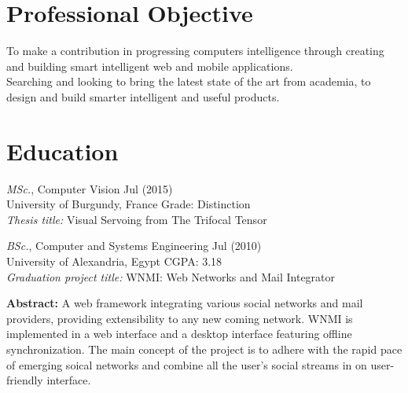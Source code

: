 \documentclass{res}
\newenvironment{details}{\vspace*{-4pt} \begin{list}{\topsep 0pt \itemsep -2pt}}{\vspace*{4pt}\end{list}}
\begin{document}
\pagestyle{empty}
\renewcommand{\headrulewidth}{0.0pt}
\pagestyle{fancy}
\lhead{}
\chead{}
\rhead{}
\lfoot{}
\cfoot{}
\address{ 7 Square du Bois Perrin, 35700, Rennes, France \\ +33603754150  \href{mailto:marwan.aosman@gmail.com}{marwan.aosman@gmail.com} \\ \url{http://www.marwanosman.com}}

\begin{resume}

\section{Professional Objective}
To make a contribution in progressing computers intelligence through creating and building smart intelligent web and mobile applications. \\
Searching and looking to bring the latest state of the art from academia, to design and build smarter intelligent and useful products.
 
\section{Education}

    {\sl MSc.}, Computer Vision \hfill Jul (2015) \\
    University of Burgundy, France \hspace{0.2in}  Grade: Distinction \\
    {\sl Thesis title:} Visual Servoing from The Trifocal Tensor

    {\sl BSc.}, Computer and Systems Engineering \hfill Jul (2010) \\
    University of Alexandria, Egypt \hspace{0.2in}  CGPA: 3.18 \\
    {\sl Graduation project title:} WNMI: Web Networks and Mail Integrator
    \begin{details}
      \item \textbf{Abstract:} A web framework integrating various social networks and mail providers, providing extensibility to any new coming network. WNMI is implemented in a web interface and a desktop interface featuring offline synchronization. The main concept of the project is to adhere with the rapid pace of emerging soical networks and combine all the user's social streams in on user-friendly interface.
    \end{details}
 

\end{resume}
\end{document}

